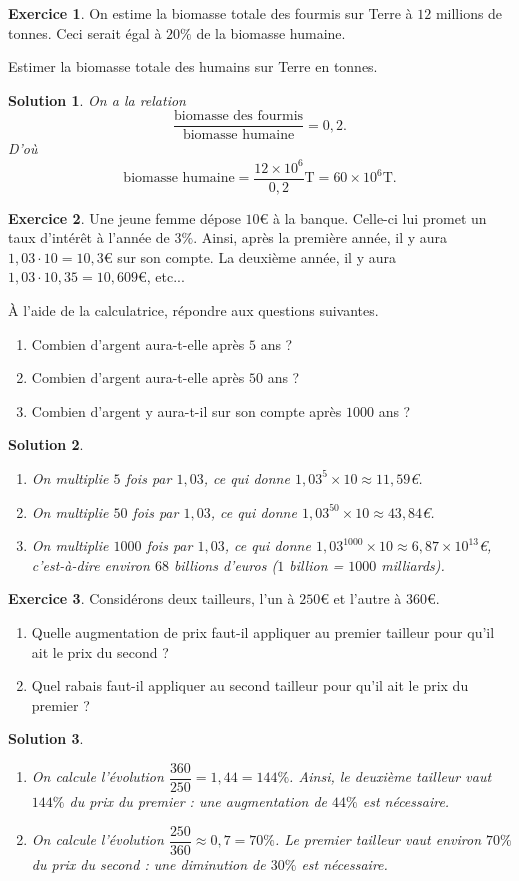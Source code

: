 \documentclass[a4paper, 14pt]{extarticle}
\theoremstyle{plain}
\newtheorem*{sol}{Solution}
\theoremstyle{definition}
\newtheorem{ex}{Exercice}
\newcommand{\exe}[2]{
		\begin{ex} #1  \end{ex}
		\begin{sol} #2 \end{sol}
	}
\newcommand{\exe}[2]{
		\begin{ex} #1  \end{ex}
	}
\begin{document}
\exe{
  On estime la biomasse totale des fourmis sur Terre à $12$ millions de tonnes.
  Ceci serait égal à $20\%$ de la biomasse humaine.

  Estimer la biomasse totale des humains sur Terre en tonnes.
}{
	On a la relation
		\[ \dfrac{\text{biomasse des fourmis}}{\text{biomasse humaine}} = 0,2. \]
	D'où
		\[ \text{biomasse humaine} = \dfrac{12 \times 10^6}{0,2} \text{T} = 60 \times 10^6 \text{T}.\] 

}

\exe{
  Une jeune femme dépose $10$€ à la banque. Celle-ci lui promet un taux d'intérêt à l'année de $3\%$.
  Ainsi, après la première année, il y aura $1{,}03 \cdot 10 = 10{,}3$€ sur son compte.
  La deuxième année, il y aura $1{,}03 \cdot 10{,}35 = 10{,}609$€, etc...

  À l'aide de la calculatrice, répondre aux questions suivantes.
  \begin{enumerate}
  \item Combien d'argent aura-t-elle après $5$ ans ?
  \item Combien d'argent aura-t-elle après $50$ ans ?
  \item Combien d'argent y aura-t-il sur son compte après $1000$ ans ?
  \end{enumerate}
}
{
  \begin{enumerate}
  \item On multiplie $5$ fois par $1,03$, ce qui donne $1,03^5 \times 10  \approx 11,59$€.
  \item On multiplie $50$ fois par $1,03$, ce qui donne $1,03^{50} \times 10  \approx 43,84$€.
  \item On multiplie $1000$ fois par $1,03$, ce qui donne $1,03^{1000} \times 10  \approx 6,87 \times 10^{13}$€, c'est-à-dire environ $68$ billions d'euros ($1$ billion = $1000$ milliards).
  \end{enumerate}
}

\exe{
  Considérons deux tailleurs, l'un à $250$€ et l'autre à $360$€.
  \begin{enumerate}
  \item Quelle augmentation de prix faut-il appliquer au premier tailleur pour qu'il ait le prix du second ?
  \item Quel rabais faut-il appliquer au second tailleur pour qu'il ait le prix du premier ?
  \end{enumerate}
}{
  \begin{enumerate}
  \item On calcule l'évolution $\dfrac{360}{250}  = 1,44 = 144\%$. Ainsi, le deuxième tailleur vaut $144\%$ du prix du premier : une augmentation de $44\%$ est nécessaire.
  \item On calcule l'évolution $\dfrac{250}{360}  \approx 0,7 = 70\%$. Le premier tailleur vaut environ $70\%$ du prix du second : une diminution de $30\%$ est nécessaire.
  \end{enumerate}
}
\end{document}
